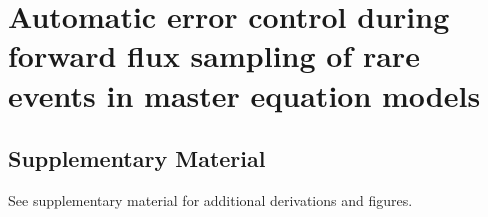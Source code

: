 


%

\chapter{Automatic error control during forward flux sampling of rare events in master equation models}





%

%

\section*{Supplementary Material}
See supplementary material for additional derivations and figures.

